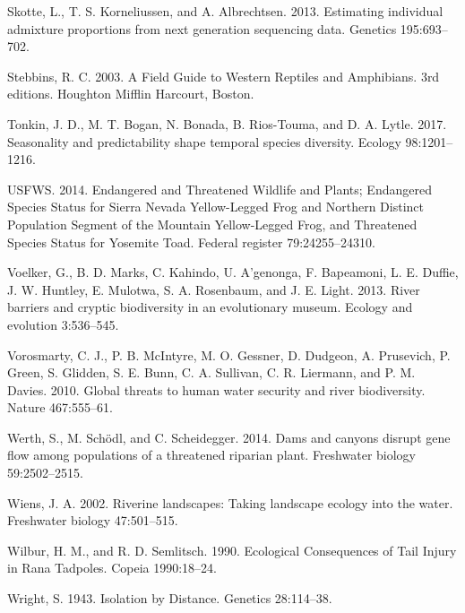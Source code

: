 \documentclass[proquest,12pt,final]{ucthesis-CA2012} %
\begin{document}
\begin{ucmainmatter}
\leavevmode\hypertarget{ref-skotte_estimating_2013}{}%
Skotte, L., T. S. Korneliussen, and A. Albrechtsen. 2013. Estimating
individual admixture proportions from next generation sequencing data.
Genetics 195:693--702.

\leavevmode\hypertarget{ref-stebbins_field_2003}{}%
Stebbins, R. C. 2003. A Field Guide to Western Reptiles and Amphibians.
3rd editions. Houghton Mifflin Harcourt, Boston.

\leavevmode\hypertarget{ref-tonkin_seasonality_2017}{}%
Tonkin, J. D., M. T. Bogan, N. Bonada, B. Rios-Touma, and D. A. Lytle.
2017. Seasonality and predictability shape temporal species diversity.
Ecology 98:1201--1216.

\leavevmode\hypertarget{ref-usfws_endangered_2014}{}%
USFWS. 2014. Endangered and Threatened Wildlife and Plants; Endangered
Species Status for Sierra Nevada Yellow-Legged Frog and Northern
Distinct Population Segment of the Mountain Yellow-Legged Frog, and
Threatened Species Status for Yosemite Toad. Federal register
79:24255--24310.

\leavevmode\hypertarget{ref-voelker_river_2013}{}%
Voelker, G., B. D. Marks, C. Kahindo, U. A'genonga, F. Bapeamoni, L. E.
Duffie, J. W. Huntley, E. Mulotwa, S. A. Rosenbaum, and J. E. Light.
2013. River barriers and cryptic biodiversity in an evolutionary museum.
Ecology and evolution 3:536--545.

\leavevmode\hypertarget{ref-vorosmarty_global_2010}{}%
Vorosmarty, C. J., P. B. McIntyre, M. O. Gessner, D. Dudgeon, A.
Prusevich, P. Green, S. Glidden, S. E. Bunn, C. A. Sullivan, C. R.
Liermann, and P. M. Davies. 2010. Global threats to human water security
and river biodiversity. Nature 467:555--61.

\leavevmode\hypertarget{ref-werth_dams_2014}{}%
Werth, S., M. Schödl, and C. Scheidegger. 2014. Dams and canyons disrupt
gene flow among populations of a threatened riparian plant. Freshwater
biology 59:2502--2515.

\leavevmode\hypertarget{ref-wiens_riverine_2002}{}%
Wiens, J. A. 2002. Riverine landscapes: Taking landscape ecology into
the water. Freshwater biology 47:501--515.

\leavevmode\hypertarget{ref-wilbur_ecological_1990}{}%
Wilbur, H. M., and R. D. Semlitsch. 1990. Ecological Consequences of
Tail Injury in Rana Tadpoles. Copeia 1990:18--24.

\leavevmode\hypertarget{ref-wright_isolation_1943}{}%
Wright, S. 1943. Isolation by Distance. Genetics 28:114--38.


\end{ucmainmatter}
\end{document}
